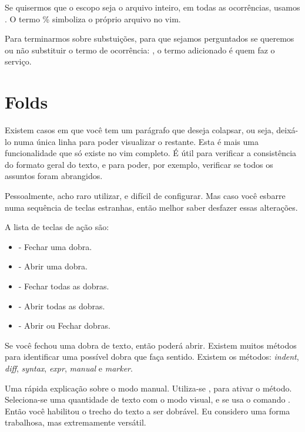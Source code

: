 Se quisermos que o escopo seja o arquivo inteiro, em todas as ocorrências, usamos .
O termo \% simboliza o próprio arquivo no vim.



Para terminarmos sobre substuições, para que sejamos perguntados se queremos ou não substituir o termo de ocorrência:
, o termo  adicionado é quem faz o serviço.

\section{Folds}
Existem casos em que você tem um parágrafo que deseja colapsar, ou seja, deixá-lo numa única linha para poder visualizar o restante.
Esta é mais uma funcionalidade que só existe no vim completo.
É útil para verificar a consistência do formato geral do texto, e para poder, por exemplo, verificar se todos os assuntos foram abrangidos.

Pessoalmente, acho raro utilizar, e difícil de configurar.
Mas caso você esbarre numa sequência de teclas estranhas, então melhor saber desfazer essas alterações.

A lista de teclas de ação são:
\begin{itemize}
    \item {} - Fechar uma dobra.
    \item {} - Abrir uma dobra.
    \item {} - Fechar todas as dobras.
    \item {} - Abrir todas as dobras.
    \item {} - Abrir ou Fechar dobras.
\end{itemize}

Se você fechou uma dobra de texto, então poderá abrir.
Existem muitos métodos para identificar uma possível dobra que faça sentido.
Existem os métodos: \textit{indent}, \textit{diff}, \textit{syntax}, \textit{expr}, \textit{manual} e \textit{marker}.

Uma rápida explicação sobre o modo manual.
Utiliza-se , para ativar o método.
Seleciona-se uma quantidade de texto com o modo visual, e se usa o comando .
Então você habilitou o trecho do texto a ser dobrável.
Eu considero uma forma trabalhosa, mas extremamente versátil.

